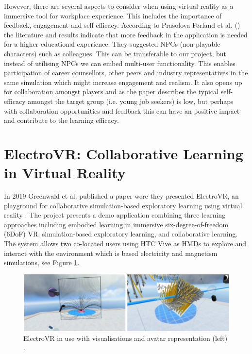 However, there are several aspects to consider when using virtual reality as a immersive tool for workplace experience. This includes the importance of feedback, engagement and self-efficacy. According to Prasolova-Førland et al. (\citeyear{prasolova2019empowering}) the literature and results indicate that more feedback in the application is needed for a higher educational experience. They suggested NPCs (non-playable characters) such as colleagues. This can be transferable to our project, but instead of utilising NPCs we can embed multi-user functionality. This enables participation of career counsellors, other peers and industry representatives in the same simulation which might increase engagement and realism. It also opens up for collaboration amongst players and as the paper describes the typical self-efficacy amongst the target group (i.e. young job seekers) is low, but perhaps with collaboration opportunities and feedback this can have an positive impact and contribute to the learning efficacy.  



\section{ElectroVR: Collaborative Learning in Virtual Reality}
\label{section:electroVR}
In 2019 Greenwald et al. published a paper were they presented ElectroVR, an playground for collaborative simulation-based exploratory learning using virtual reality \cite{greenwald2019electrovr}. The project presents a demo application combining three learning approaches including embodied learning in immersive six-degree-of-freedom (6DoF)  VR,  simulation-based  exploratory  learning,  and collaborative learning. The system allows two co-located users using HTC Vive as HMDs to explore and interact with the environment which is based electricity and  magnetism simulations, see Figure \ref{fig:electroVR}.

 \begin{figure}[!ht]
     \centering
     \includegraphics[width=.9\textwidth]{./fig/related_work/electroVR.PNG}
     \caption{ElectroVR in use with visualisations and avatar representation (left) \cite{greenwald2019electrovr}. }
     \label{fig:electroVR}
 \end{figure}
 
